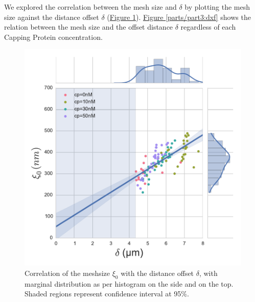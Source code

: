\documentclass[A4paperpaper,11pt,english]{sphinxmanual}
\begin{document}
We explored the correlation between the mesh size and \(\delta\) by plotting  the mesh size against the distance offset \(\delta\) (\hyperref[parts/part3:dxcf]{Figure  \ref*{parts/part3:dxcf}}).
\hyperref[parts/part3:dxf]{Figure  \ref*{parts/part3:dxf}} shows the relation between the mesh size and the offset
distance \(\delta\) regardless of each Capping Protein concentration.
\begin{figure}[htbp]
\centering
\capstart

\includegraphics[width=1.000\linewidth]{delta-xi-corr.pdf}
\caption{Correlation of the meshsize \(\xi_0\) with the distance offset \(\delta\),
with marginal distribution as per histogram on the side and on the top.  Shaded
regions represent confidence interval at 95\%.}\label{parts/part3:dxcf}\end{figure}
\end{document}
